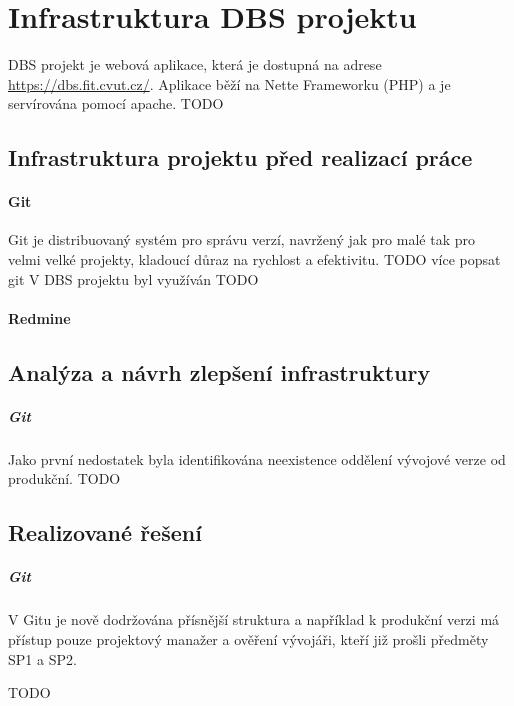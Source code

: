 \chapter{Infrastruktura DBS projektu} \label{infrastructure}

DBS projekt je webová aplikace, která je dostupná na adrese \url{https://dbs.fit.cvut.cz/}. Aplikace běží na Nette Frameworku (PHP) a je servírována pomocí apache.
TODO


\section{Infrastruktura projektu před realizací práce}

\subsubsection{Git}

Git \cite{git} je distribuovaný systém pro správu verzí, navržený jak pro malé tak pro velmi velké projekty, kladoucí důraz na rychlost a efektivitu.
TODO více popsat git
V DBS projektu byl využíván TODO

\subsubsection{Redmine} \label{infrastructure:redmine}


\section{Analýza a návrh zlepšení infrastruktury}

\paragraph{Git} Jako první nedostatek byla identifikována neexistence oddělení vývojové verze od produkční.
TODO


\section{Realizované řešení}

\paragraph{Git} V Gitu je nově dodržována přísnější struktura a například k produkční verzi má přístup pouze projektový manažer a ověření vývojáři, kteří již prošli předměty SP1 a SP2.

TODO
